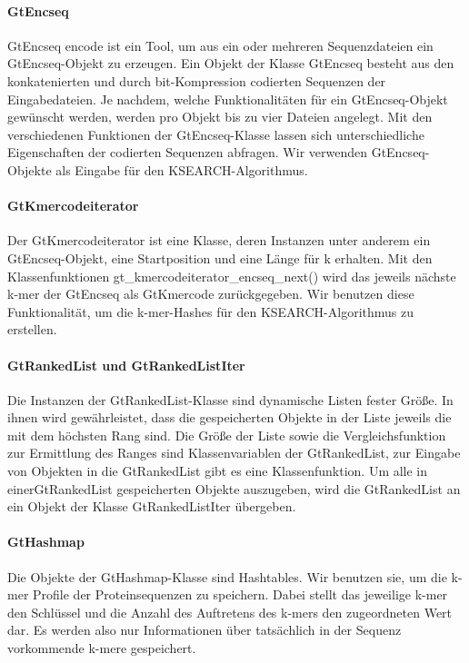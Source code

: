\documentclass{article}
\begin{document}
\paragraph{GtEncseq}
GtEncseq encode ist ein Tool, um aus ein oder mehreren Sequenzdateien ein
GtEncseq-Objekt zu erzeugen. Ein Objekt der Klasse GtEncseq besteht aus den
konkatenierten und durch bit-Kompression codierten Sequenzen der Eingabedateien.
Je nachdem, welche Funktionalitäten für ein GtEncseq-Objekt gewünscht werden, werden pro Objekt bis zu vier Dateien angelegt. Mit den verschiedenen Funktionen der GtEncseq-Klasse lassen sich unterschiedliche Eigenschaften der codierten Sequenzen abfragen. Wir verwenden GtEncseq-Objekte als Eingabe für den KSEARCH-Algorithmus.

\paragraph{GtKmercodeiterator}
Der GtKmercodeiterator ist eine Klasse, deren Instanzen unter anderem ein GtEncseq-Objekt, eine Startposition und eine Länge für k erhalten. Mit den Klassenfunktionen gt\_kmercodeiterator\_encseq\_next() wird das jeweils nächste k-mer der GtEncseq als GtKmercode zurückgegeben. Wir benutzen diese Funktionalität, um die k-mer-Hashes für den KSEARCH-Algorithmus zu erstellen.

\paragraph{GtRankedList und GtRankedListIter}
Die Instanzen der GtRankedList-Klasse sind dynamische Listen fester Größe. In ihnen wird gewährleistet, dass die gespeicherten Objekte in der Liste jeweils die mit dem höchsten Rang sind. Die Größe der Liste sowie die Vergleichsfunktion zur Ermittlung des Ranges sind Klassenvariablen der GtRankedList, zur Eingabe von Objekten in die GtRankedList gibt es eine Klassenfunktion. Um alle in einerGtRankedList gespeicherten Objekte auszugeben, wird die GtRankedList an ein Objekt der Klasse GtRankedListIter übergeben.

\paragraph{GtHashmap}
Die Objekte der GtHashmap-Klasse sind Hashtables. Wir benutzen sie, um die k-mer
Profile der Proteinsequenzen zu speichern. Dabei stellt das jeweilige k-mer den
Schlüssel und die Anzahl des Auftretens des k-mers den zugeordneten Wert dar. Es
werden also nur Informationen über tatsächlich in der Sequenz vorkommende k-mere
gespeichert.
\end{document}
